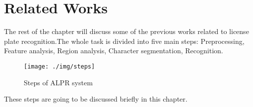 \section{Related Works}
The rest of the chapter will discuss some of the previous works related to license plate recognition.The whole task is divided into five main steps: Preprocessing, Feature analysis, Region analysis, Character segmentation, Recognition.
	
\begin{figure}
    \centering
    \texttt{[image: ./img/steps]}
    \caption{Steps of ALPR system}
    \label{fig:STEPS}
\end{figure} 
    
These steps are going to be discussed briefly in this chapter.
